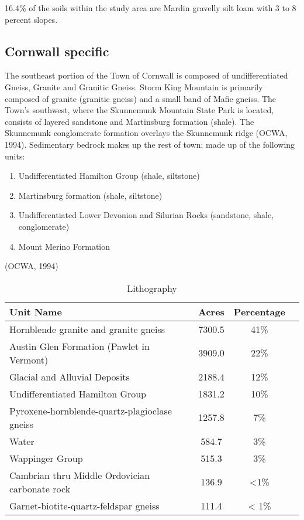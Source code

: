 16.4\% of the soils within the study area are Mardin gravelly silt loam with 3 to 8 percent slopes. 

\subsection{Cornwall specific}
The southeast portion of the Town of Cornwall is composed of undifferentiated Gneiss, Granite and Granitic Gneiss. Storm King Mountain is primarily composed of granite (granitic gneiss) and a small band of Mafic gneiss. The Town's southwest, where the Skunnemunk Mountain State Park is located, consists of layered sandstone and Martinsburg formation (shale). The Skunnemunk conglomerate formation overlays the Skunnemunk ridge (OCWA, 1994). Sedimentary bedrock makes up the rest of town; made up of the following units:

\begin{enumerate}
\item Undifferentiated Hamilton Group (shale, siltstone)
\item Martinsburg formation (shale, siltstone)
\item Undifferentiated Lower Devonion and Silurian Rocks (sandstone, shale, conglomerate)
\item Mount Merino Formation 
\end{enumerate}
(OCWA, 1994)

\begin{table}[h!]
    \begin{tabular}{l c c c}
    Unit Name & Acres & Percentage \\
    \hline
    Hornblende granite and granite gneiss &	7300.5 & 41\%\\
    Austin Glen Formation (Pawlet in Vermont) &	3909.0 & 22\% \\
    Glacial and Alluvial Deposits &	2188.4 & 12\% \\
    Undifferentiated Hamilton Group & 1831.2 & 10\% \\
    Pyroxene-hornblende-quartz-plagioclase gneiss & 1257.8 & 7\%\\
    Water & 584.7 & 3\%\\
    Wappinger Group & 515.3 & 3\% \\
    Cambrian thru Middle Ordovician carbonate rock & 136.9 & <1\%\\
    Garnet-biotite-quartz-feldspar gneiss &	111.4 & < 1\%\\
    \end{tabular}
    \caption{Lithography}
    \label{tab:Cornwall_lith}
\end{table}

